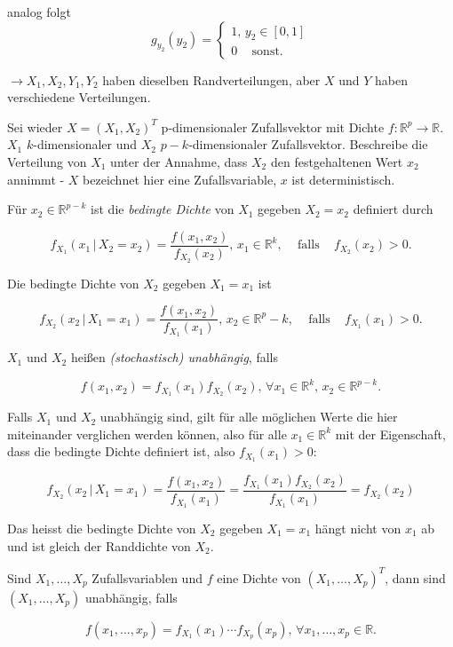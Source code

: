 \documentclass[12pt, a4paper]{article}
\theoremstyle{empty}
\newcommand{\R}{\mathbb{R}}
\newcommand{\1}{\mathds{1}}
\providecommand{\mtext}[1]{\quad \text{#1} \quad}
\begin{document}
analog folgt 
\[ g_{y_2}(y_2) = 
\begin{cases} 1, \, y_2 \in [0,1] \\
0 \, \mtext{sonst.} \end{cases} \]

$\rightarrow X_1, X_2, Y_1, Y_2$ haben dieselben Randverteilungen, aber $X$ und $Y$ haben verschiedene Verteilungen.



Sei wieder $X = (X_1, X_2)^T$ p-dimensionaler Zufallsvektor mit Dichte $f: \R^p \to \R$. $X_1$ $k$-dimensionaler und $X_2$ $p-k$-dimensionaler Zufallsvektor. Beschreibe die Verteilung von $X_1$ unter der Annahme, dass $X_2$ den festgehaltenen Wert $x_2$ annimmt - $X$ bezeichnet hier eine Zufallsvariable, $x$ ist deterministisch.

Für $x_2 \in \R^{p-k}$ ist die \emph{bedingte Dichte} von $X_1$ gegeben $X_2 = x_2$ definiert durch 

\[ f_{X_1}(x_1 \, | \,  X_2 = x_2) = \frac{f(x_1, x_2)}{f_{X_2} (x_2) } , \, x_1 \in \R^k, \, \mtext{falls} \, f_{X_2}(x_2) > 0. \]

Die bedingte Dichte von $X_2$ gegeben $X_1 = x_1$ ist

\[ f_{X_2}(x_2 \, | \, X_1 = x_1) = \frac{f(x_1, x_2)}{f_{X_1} (x_1) } , \, x_2 \in \R^p-k, \, \mtext{falls} \, f_{X_1}(x_1) > 0. \]

$X_1$ und $X_2$ heißen \emph{(stochastisch) unabhängig}, falls 

\[ f(x_1, x_2) = f_{X_1}(x_1) f_{X_2}(x_2), \, \forall x_1 \in \R^k, \,  x_2 \in \R^{p-k}. \]

Falls $X_1$ und $X_2$ unabhängig sind, gilt für alle möglichen Werte die hier miteinander verglichen werden können, also für alle $x_1 \in \R^k$ mit der Eigenschaft, dass die bedingte Dichte definiert ist, also $f_{X_1}(x_1) > 0$:

\[ f_{X_2}(x_2 \, | \,  X_1 = x_1) = \frac{f(x_1, x_2)}{f_{X_1} (x_1)} =  \frac{f_{X_1}(x_1) f_{X_2} (x_2)}{f_{X_1} (x_1)} = f_{X_2}(x_2) \]

Das heisst die bedingte Dichte von $X_2$ gegeben $X_1 = x_1$ hängt nicht von $x_1$ ab und ist gleich der Randdichte von $X_2$.

Sind $X_1, \ldots, X_p$ Zufallsvariablen und $f$ eine Dichte von $(X_1, \ldots, X_p)^T$, dann sind $(X_1, \ldots, X_p)$ unabhängig, falls

\[ f(x_1, \ldots, x_p) = f_{X_1}(x_1) \cdots f_{X_p}(x_p), \, \forall x_1, \ldots, x_p \in \R. \]
\end{document}
